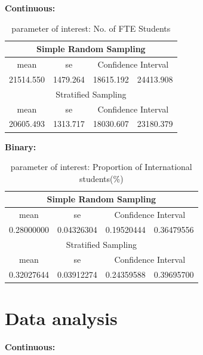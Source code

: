 \documentclass{article}
\begin{document}
\textbf{Continuous:}\\

 \begin{table}[h]
    \begin{center}
    \caption{parameter of interest: No. of FTE Students}
    \begin{tabular}{ | c| c | c | c |}
    \hline
    \multicolumn{4}{|c|}{Simple Random Sampling} \\
    \hline
    mean & se & \multicolumn{2}{|c|}{Confidence Interval} \\ 
    \hline
    21514.550 & 1479.264 & 18615.192 & 24413.908\\ 
    \hline
    \multicolumn{4}{|c|}{Stratified Sampling} \\
    \hline
    mean & se & \multicolumn{2}{|c|}{Confidence Interval} \\ 
    \hline
    20605.493 & 1313.717 & 18030.607 & 23180.379\\ 
    \hline
    \end{tabular}
    \label{tab:(a)}
    \end{center}
    \end{table}

\textbf{Binary:}

\begin{table}[h]
    \begin{center}
    \caption{parameter of interest: Proportion of International students(\%)}
    \begin{tabular}{ | c| c | c | c |}
    \hline
    \multicolumn{4}{|c|}{Simple Random Sampling} \\
    \hline
    mean & se & \multicolumn{2}{|c|}{Confidence Interval} \\ 
    \hline
    0.28000000 & 0.04326304 & 0.19520444 & 0.36479556\\ 
    \hline
    \multicolumn{4}{|c|}{Stratified Sampling} \\
    \hline
    mean & se & \multicolumn{2}{|c|}{Confidence Interval} \\ 
    \hline
    0.32027644 & 0.03912274 & 0.24359588 & 0.39695700\\ 
    \hline
    \end{tabular}
    \label{tab:(b)}
    \end{center}
    \end{table}



\newpage
\section{Data analysis}
\textbf{Continuous:}
\end{document}
